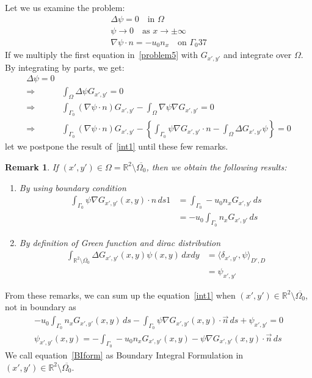 \documentclass[a4paper,12pt]{article}
\newtheorem{remark}{Remark}
\newcommand{\integ}[3]{%
\ensuremath{\displaystyle{\int^{#2}_{#1} #3}}}
\begin{document}
Let we us examine the problem:
\begin{align}  \label{problem5}
\Delta \psi=0 \quad \text{in } \Omega\\
\psi \to 0 \quad \text{as } x\to\pm\infty\\
\nabla\psi \cdot n = -u_0 n_x \quad \text{on } \Gamma_0 37
\end{align}
If we multiply the first equation in~\eqref{problem5} with $G_{x',y'}$ and integrate over 
$\Omega$. By integrating by parts, we get:
\begin{align}
\Delta\psi=0\\
\Rightarrow&\integ{\Omega}{}{ \Delta \psi G_{x',y'}}=0\\
\Rightarrow& \integ{\Gamma_0}{}{(\nabla \psi \cdot n)G_{x',y'}}-\integ{\Omega}{}
{\nabla\psi \nabla G_{x',y'}}=0\\
\Rightarrow&\integ{\Gamma_0}{}{(\nabla \psi \cdot n)G_{x',y'}}-
\left\{\integ{\Gamma_0}{}{\psi \nabla G_{x',y'}\cdot n}-
\integ{\Omega}{}{\Delta G_{x',y'} \psi}\right\}=0 \label{int1}
\end{align}
let we postpone the result of~\eqref{int1} until these few remarks.
\begin{remark}
 If $(x',y')\in \Omega=\mathbb{R}^2 \setminus\overline{\Omega_0}$, then we obtain the following results:
\begin{enumerate}
 \item By using boundary condition
\begin{align}
 \integ{\Gamma_0}{}{\psi \nabla G_{x',y'}(x,y)\cdot n \, ds1}&=\integ{\Gamma_0}{}{-u_0 n_x G_{x',y'} \, ds}\\
&= -u_0 \integ{\Gamma_0}{}{n_x G_{x',y'} \, ds}
\end{align}
\item By definition of Green function and dirac distribution
\begin{align}
 \integ{\mathbb{R}^2 \setminus \overline{\Omega_0}}{}{\Delta G_{x',y'}(x,y) \psi (x,y) \, dxdy}&=
{\langle\delta_{x',y'}{,} \psi\rangle}_{D',D}\\
&=\psi_{x',y'}
\end{align}
\end{enumerate}
\end{remark}
From these remarks, we can sum up the equation~\eqref{int1} 
when $(x',y')\in\mathbb{R}^2\setminus\overline{\Omega_0}$, not in boundary as
\begin{align}
 -u_0 \integ{\Gamma_0}{}{n_x G_{x',y'}(x,y) \, ds}-
\integ{\Gamma_0}{}{\psi\nabla G_{x',y'}(x,y)\cdot \vec{n} \, ds}+\psi_{x',y'}=0\\
\psi_{x',y'}(x,y)=-\integ{\Gamma_0}{}{-u_0 n_x G_{x',y'}(x,y) -\psi\nabla G_{x',y'}(x,y)\cdot \vec{n} \, ds} \label{BIform}
\end{align}
We call equation~\eqref{BIform} as Boundary Integral Formulation in $(x',y')\in \mathbb{R}^2\setminus\overline{\Omega_0}$.
\end{document}
